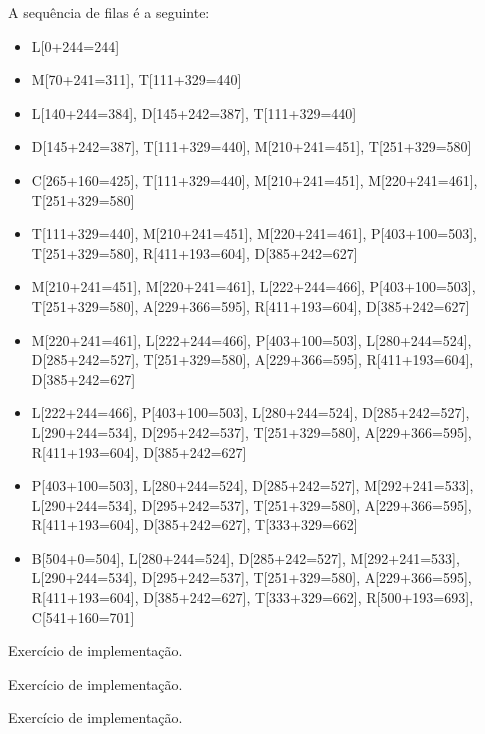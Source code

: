 \begin{solution}
A sequência de filas é a seguinte:

\begin{itemize}[itemsep=10pt]
	\item L[0+244=244]
	\item M[70+241=311], T[111+329=440]
	\item L[140+244=384], D[145+242=387], T[111+329=440]
	\item D[145+242=387], T[111+329=440], M[210+241=451], T[251+329=580]
	\item C[265+160=425], T[111+329=440], M[210+241=451], M[220+241=461], T[251+329=580]
	\item T[111+329=440], M[210+241=451], M[220+241=461], P[403+100=503], T[251+329=580], R[411+193=604], D[385+242=627]
	\item M[210+241=451], M[220+241=461], L[222+244=466], P[403+100=503], T[251+329=580], A[229+366=595], R[411+193=604], D[385+242=627]
	\item M[220+241=461], L[222+244=466], P[403+100=503], L[280+244=524], D[285+242=527], T[251+329=580], A[229+366=595], R[411+193=604], D[385+242=627]
	\item L[222+244=466], P[403+100=503], L[280+244=524], D[285+242=527], L[290+244=534], D[295+242=537], T[251+329=580], A[229+366=595], R[411+193=604], D[385+242=627]
	\item P[403+100=503], L[280+244=524], D[285+242=527], M[292+241=533], L[290+244=534], D[295+242=537], T[251+329=580], A[229+366=595], R[411+193=604], D[385+242=627], T[333+329=662]
	\item B[504+0=504], L[280+244=524], D[285+242=527], M[292+241=533], L[290+244=534], D[295+242=537], T[251+329=580], A[229+366=595], R[411+193=604], D[385+242=627], T[333+329=662], R[500+193=693], C[541+160=701]
\end{itemize}
\end{solution}

\begin{solution}
Exercício de implementação.
\end{solution}

\begin{solution}
Exercício de implementação.	
\end{solution}

\begin{solution}
Exercício de implementação.
\end{solution}


